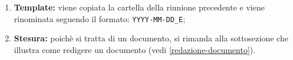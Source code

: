 \begin{itemize}
\begin{enumerate}
		      \item \textbf{Template:} viene copiata la cartella della
		            riunione precedente e viene rinominata seguendo il formato:
		            \texttt{YYYY-MM-DD\_E};

		      \item \textbf{Stesura:} poichè si tratta di un documento, si
		            rimanda alla sottosezione che illustra come redigere un
		            documento (vedi \autoref{redazione-documento}).
	      \end{enumerate}
\end{itemize}
